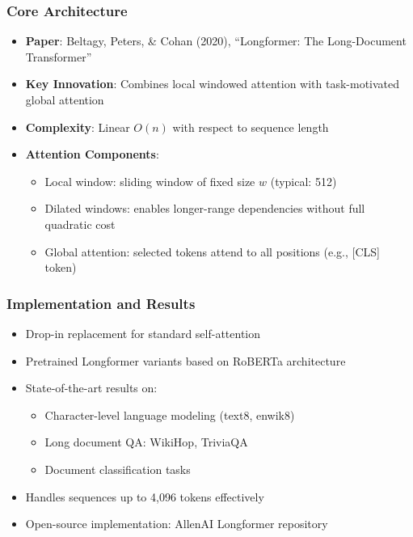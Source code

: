 \documentclass[11pt]{article}
\begin{document}
\subsubsection{Core Architecture}
\begin{itemize}[leftmargin=*]
    \item \textbf{Paper}: Beltagy, Peters, \& Cohan (2020), ``Longformer: The Long-Document Transformer''~\cite{beltagy2020longformer}
    \item \textbf{Key Innovation}: Combines local windowed attention with task-motivated global attention
    \item \textbf{Complexity}: Linear $O(n)$ with respect to sequence length
    \item \textbf{Attention Components}:
    \begin{itemize}
        \item Local window: sliding window of fixed size $w$ (typical: 512)
        \item Dilated windows: enables longer-range dependencies without full quadratic cost
        \item Global attention: selected tokens attend to all positions (e.g., [CLS] token)
    \end{itemize}
\end{itemize}

\subsubsection{Implementation and Results}
\begin{itemize}[leftmargin=*]
    \item Drop-in replacement for standard self-attention
    \item Pretrained Longformer variants based on RoBERTa architecture
    \item State-of-the-art results on:
    \begin{itemize}
        \item Character-level language modeling (text8, enwik8)
        \item Long document QA: WikiHop, TriviaQA
        \item Document classification tasks
    \end{itemize}
    \item Handles sequences up to 4,096 tokens effectively
    \item Open-source implementation: AllenAI Longformer repository
\end{itemize}
\end{document}
